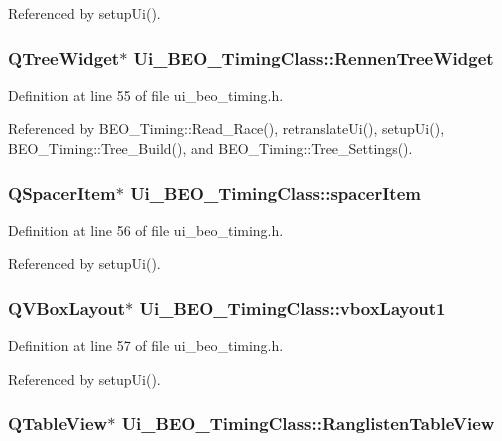 Referenced by setupUi().\hypertarget{class_ui___b_e_o___timing_class_ec5ef60597da04626e900f8ee0482d3b}{
\subsubsection[RennenTreeWidget]{\setlength{\rightskip}{0pt plus 5cm}QTreeWidget$\ast$ {\bf Ui\_\-BEO\_\-TimingClass::RennenTreeWidget}}}
\label{class_ui___b_e_o___timing_class_ec5ef60597da04626e900f8ee0482d3b}




Definition at line 55 of file ui\_\-beo\_\-timing.h.

Referenced by BEO\_\-Timing::Read\_\-Race(), retranslateUi(), setupUi(), BEO\_\-Timing::Tree\_\-Build(), and BEO\_\-Timing::Tree\_\-Settings().\hypertarget{class_ui___b_e_o___timing_class_b299f96ad3b1c549f9a2e636d298045f}{
\subsubsection[spacerItem]{\setlength{\rightskip}{0pt plus 5cm}QSpacerItem$\ast$ {\bf Ui\_\-BEO\_\-TimingClass::spacerItem}}}
\label{class_ui___b_e_o___timing_class_b299f96ad3b1c549f9a2e636d298045f}




Definition at line 56 of file ui\_\-beo\_\-timing.h.

Referenced by setupUi().\hypertarget{class_ui___b_e_o___timing_class_368e591e8cfe5881bee4457fe930f3f0}{
\subsubsection[vboxLayout1]{\setlength{\rightskip}{0pt plus 5cm}QVBoxLayout$\ast$ {\bf Ui\_\-BEO\_\-TimingClass::vboxLayout1}}}
\label{class_ui___b_e_o___timing_class_368e591e8cfe5881bee4457fe930f3f0}




Definition at line 57 of file ui\_\-beo\_\-timing.h.

Referenced by setupUi().\hypertarget{class_ui___b_e_o___timing_class_276d00234a42b378490de034b6b49279}{
\subsubsection[RanglistenTableView]{\setlength{\rightskip}{0pt plus 5cm}QTableView$\ast$ {\bf Ui\_\-BEO\_\-TimingClass::RanglistenTableView}}}
\label{class_ui___b_e_o___timing_class_276d00234a42b378490de034b6b49279}




